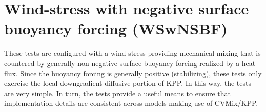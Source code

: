 \chapter{Wind-stress with negative surface buoyancy forcing
   (WSwNSBF)}

 These tests are configured with a wind stress providing mechanical
 mixing that is countered by generally non-negative surface buoyancy
 forcing realized by a heat flux.  Since the buoyancy forcing is
 generally positive (stabilizing), these tests only exercise the local
 downgradient diffusive portion of KPP.  In this way, the tests are
 very simple.  In turn, the tests provide a useful means to ensure
 that implementation details are consistent across models making use
 of CVMix/KPP.


